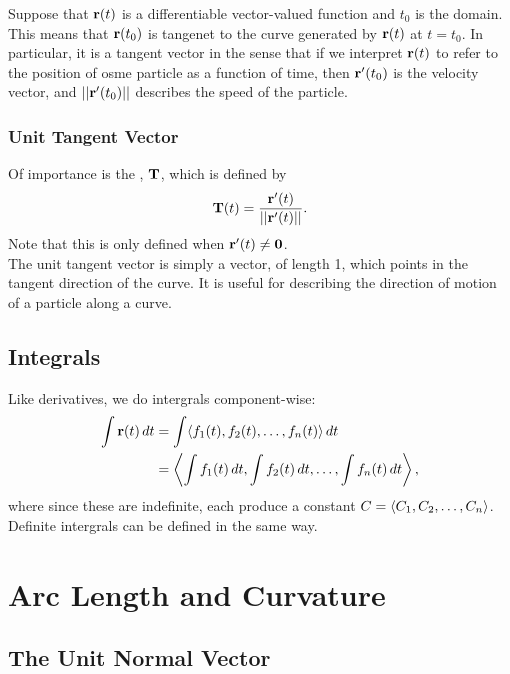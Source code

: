 Suppose that \(\mathbf{r}(t)\) is a differentiable vector-valued function and \(t_{0}\) is the domain. This means that \(\mathbf{r}(t_{0})\) is tangenet to the curve generated by \(\mathbf{r}(t)\) at \(t = t_{0}\). In particular, it is a tangent vector in the sense that if we interpret \(\mathbf{r}(t)\) to refer to the position of osme particle as a function of time, then \(\mathbf{r}'(t_{0})\) is the velocity vector, and \(||\mathbf{r}'(t_{0})||\) describes the speed of the particle.

\subsubsection{Unit Tangent Vector}

Of importance is the , \(\mathbf{T}\), which is defined by
\[
    \mathbf{T}(t) = \frac{\mathbf{r}'(t)}{||\mathbf{r}'(t)||}.
\]
Note that this is only defined when \(\mathbf{r}'(t) \ne \mathbf{0}\). \\

The unit tangent vector is simply a vector, of length 1, which points in the tangent direction of the curve. It is useful for describing the direction of motion of a particle along a curve.

\subsection{Integrals}

Like derivatives, we do intergrals component-wise:
\begin{align*}
    \int \mathbf{r}(t) \, dt &= \int \langle f_{1}(t),f_{2}(t),\ldots,f_{n}(t) \rangle \, dt \\
    &= \left\langle \int f_{1}(t) \, dt, \int f_{2}(t) \, dt, \ldots, \int f_{n}(t) \, dt \right\rangle,
\end{align*}
where since these are indefinite, each produce a constant \(C = \left\langle C_{1},C_{2},\ldots,C_{n} \right\rangle\). Definite intergrals can be defined in the same way.





\newpage

\section{Arc Length and Curvature}

\subsection{The Unit Normal Vector}

